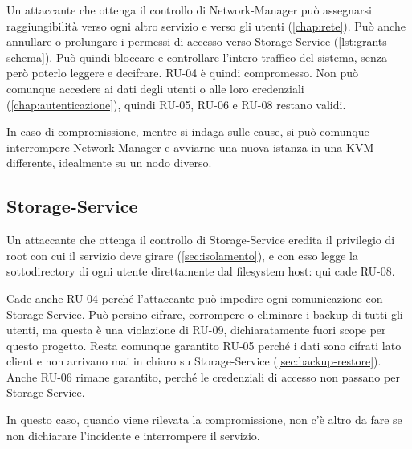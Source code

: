 Un attaccante che ottenga il controllo di Network-Manager può assegnarsi raggiungibilità verso ogni altro
servizio e verso gli utenti (\autoref{chap:rete}). Può anche annullare o prolungare i permessi di accesso verso
Storage-Service (\autoref{lst:grants-schema}).
Può quindi bloccare e controllare l'intero traffico del sistema, senza però poterlo leggere e decifrare.
RU-04 è quindi compromesso.
Non può comunque accedere ai dati degli utenti o alle loro credenziali (\autoref{chap:autenticazione}), quindi
RU-05, RU-06 e RU-08 restano validi.

In caso di compromissione, mentre si indaga sulle cause, si può comunque interrompere Network-Manager e 
avviarne una nuova istanza in una KVM differente, idealmente su un nodo diverso.

\subsection{Storage-Service}

Un attaccante che ottenga il controllo di Storage-Service eredita il privilegio di root con cui il
servizio deve girare (\autoref{sec:isolamento}), e con esso legge la sottodirectory di ogni utente
direttamente dal filesystem host: qui cade RU-08.

Cade anche RU-04 perché l'attaccante può impedire ogni comunicazione con Storage-Service. 
Può persino cifrare, corrompere o eliminare i backup di tutti gli utenti, ma questa è una violazione di RU-09, 
dichiaratamente fuori scope per questo progetto.
Resta comunque garantito RU-05 perché i dati sono cifrati lato client e non arrivano mai in chiaro su
Storage-Service (\autoref{sec:backup-restore}).
Anche RU-06 rimane garantito, perché le credenziali di accesso non passano per Storage-Service. 

In questo caso, quando viene rilevata la compromissione, non c'è altro da fare se non dichiarare 
l'incidente e interrompere il servizio.  